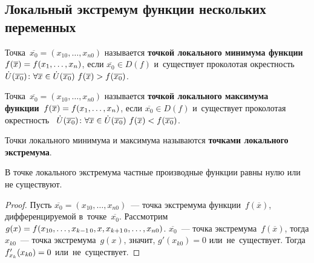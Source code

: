 \subsection{Локальный экстремум функции нескольких переменных}
Точка~$\overline{x_0} = (x_{10}, \ldots, x_{n0})$ называется \textbf{точкой локального минимума функции}~$f(\overline x) \opbr= f(x_1, \ldots, x_n)$,
если $\overline{x_0} \in D(f)$ и~существует проколотая окрестность~
$\dot U(\overline{x_0}) \colon
\forall \overline x \in \dot U(\overline{x_0}) \ \allowbreak
f(\overline x) \opbr> f(\overline{x_0})$.
	
Точка~$\overline{x_0} = (x_{10}, \ldots, x_{n0})$ называется \textbf{точкой локального максимума функции}~$f(\overline x) \opbr= f(x_1, \ldots, \allowbreak x_n)$,
если $\overline{x_0} \in D(f)$ и~существует проколотая окрестность~
$\dot U(\overline{x_0}) \colon
\forall \overline x \in \dot U(\overline{x_0}) \ \allowbreak
f(\overline x) \opbr< f(\overline{x_0})$.

Точки локального минимума и максимума называются \textbf{точками локального экстремума}.
	
\begin{theorem}
В точке локального экстремума частные производные функции равны нулю или не существуют.
\end{theorem}
\begin{proof}
Пусть $\overline{x_0} = (x_{10}, \ldots, x_{n0})$~--- точка экстремума функции~$f(\overline x)$, дифференцируемой в~точке~$\overline{x_0}$.
Рассмотрим
$g(x) \opbr= f(x_{10}, \ldots, \allowbreak x_{k-1\,0}, x, x_{k+1\,0}, \ldots, \allowbreak x_{n0})$.
$\overline{x_0}$~--- точка экстремума~$f(\overline x)$, тогда $x_{k0}$~--- точка экстремума~$g(x)$, значит, $g'(x_{k0}) = 0$ или~не~существует.
Тогда $f_{x_k}'(x_{k0}) \opbr= 0$ или~не~существует.
\end{proof}

